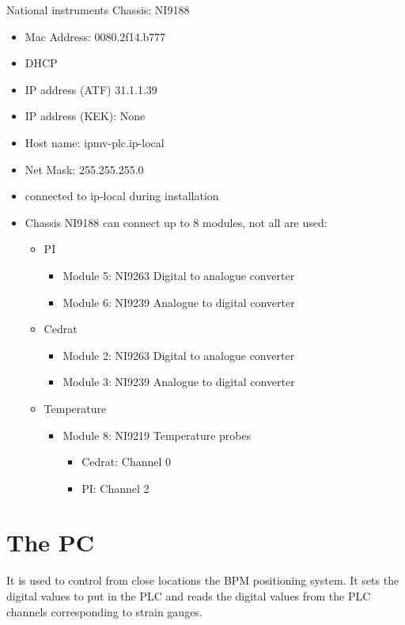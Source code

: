 \documentclass[a4paper,11pt]{book}
\begin{document}
National instruments Chassis: NI9188
\begin{itemize}
\item Mac Address: 0080.2f14.b777
\item DHCP
\item IP address (ATF) 31.1.1.39
\item IP address (KEK): None
\item Host name: ipmv-plc.ip-local
\item Net Mask: 255.255.255.0
\item connected to ip-local during installation
\item Chassis NI9188 can connect up to 8 modules, not all are used:
\begin{itemize}
\item PI
\begin{itemize}
\item Module 5: NI9263 Digital to analogue converter
\item Module 6: NI9239 Analogue to digital converter
\end{itemize}
\item Cedrat
\begin{itemize}
\item Module 2: NI9263 Digital to analogue converter
\item Module 3: NI9239 Analogue to digital converter
\end{itemize}
\item Temperature
\begin{itemize}
\item Module 8: NI9219 Temperature probes
\begin{itemize}
\item Cedrat: 	Channel 0
\item PI: Channel 2
\end{itemize}
\end{itemize}
\end{itemize}
\end{itemize}

\section{The PC}
It is used to control from close locations the BPM positioning system. It sets the digital values to put in the PLC and reads the digital values from the PLC channels corresponding to strain gauges.\par
\end{document}
